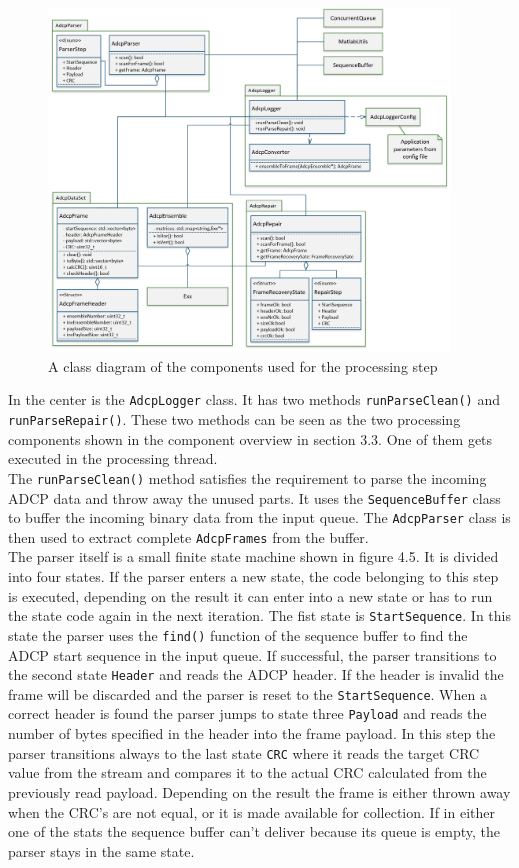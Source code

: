 \begin{figure}[h]
\centering
      \includegraphics[width=0.95\textwidth]{logger_class}
        \caption{A class diagram of the components used for the processing step}
\end{figure}

In the center is the \texttt{AdcpLogger} class. It has two methods \texttt{runParseClean()} and \texttt{runParseRepair()}. These two methods can be seen as the two processing components shown in the component overview in section 3.3. One of them gets executed in the processing thread.\\
The \texttt{runParseClean()} method satisfies the requirement to parse the incoming ADCP data and throw away the unused parts. It uses the \texttt{SequenceBuffer} class to buffer the incoming binary data from the input queue. The \texttt{AdcpParser} class is then used to extract complete \texttt{AdcpFrames} from the buffer.\\
The parser itself is a small finite state machine shown in figure 4.5. It is divided into four states. If the parser enters a new state, the code belonging to this step is executed, depending on the result it can enter into a new state or has to run the state code again in the next iteration. The fist state is \texttt{StartSequence}. In this state the parser uses the \texttt{find()} function of the sequence buffer to find the ADCP start sequence in the input queue. If successful, the parser transitions to the second state \texttt{Header} and reads the ADCP header. If the header is invalid the frame will be discarded and the parser is reset to the \texttt{StartSequence}. When a correct header is found the parser jumps to state three \texttt{Payload} and reads the number of bytes specified in the header into the frame payload. In this step the parser transitions always to the last state \texttt{CRC} where it reads the target CRC value from the stream and compares it to the actual CRC calculated from the previously read payload. Depending on the result the frame is either thrown away when the CRC's are not equal, or it is made available for collection. If in either one of the stats the sequence buffer can't deliver because its queue is empty, the parser stays in the same state.

